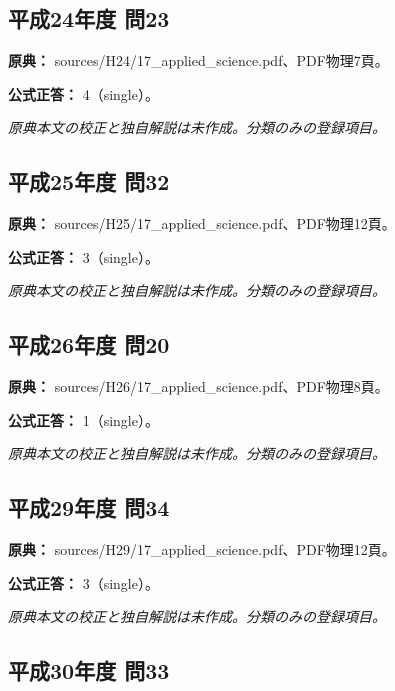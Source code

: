 \subsection{平成24年度 問23}
\label{q:h24-reg-applied-23}

\noindent\textbf{原典：} sources/H24/17\_applied\_science.pdf、PDF物理7頁。

\textbf{公式正答：} 4（single）。

\par\textit{原典本文の校正と独自解説は未作成。分類のみの登録項目。}

\subsection{平成25年度 問32}
\label{q:h25-reg-applied-32}

\noindent\textbf{原典：} sources/H25/17\_applied\_science.pdf、PDF物理12頁。

\textbf{公式正答：} 3（single）。

\par\textit{原典本文の校正と独自解説は未作成。分類のみの登録項目。}

\subsection{平成26年度 問20}
\label{q:h26-reg-applied-20}

\noindent\textbf{原典：} sources/H26/17\_applied\_science.pdf、PDF物理8頁。

\textbf{公式正答：} 1（single）。

\par\textit{原典本文の校正と独自解説は未作成。分類のみの登録項目。}

\subsection{平成29年度 問34}
\label{q:h29-reg-applied-34}

\noindent\textbf{原典：} sources/H29/17\_applied\_science.pdf、PDF物理12頁。

\textbf{公式正答：} 3（single）。

\par\textit{原典本文の校正と独自解説は未作成。分類のみの登録項目。}

\subsection{平成30年度 問33}
\label{q:h30-reg-applied-33}

